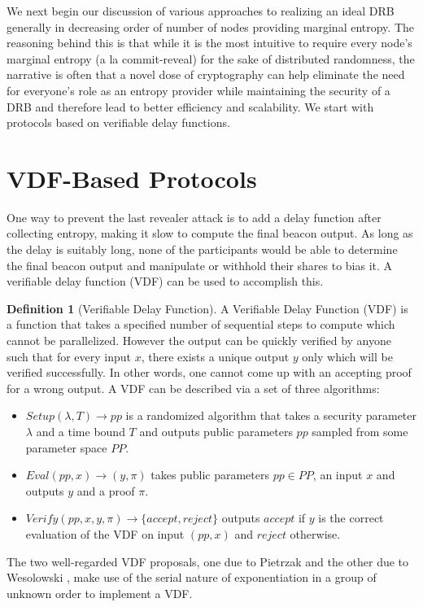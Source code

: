 \documentclass[letterpaper,twocolumn,10pt]{article}
\theoremstyle{definition}
\newtheorem{definition}[theorem]{Definition}
\theoremstyle{remark}
\begin{document}
We next begin our discussion of various approaches to realizing an ideal DRB generally in decreasing order of number of nodes providing marginal entropy. The reasoning behind this is that while it is the most intuitive to require every node's marginal entropy (a la commit-reveal) for the sake of distributed randomness, the narrative is often that a novel dose of cryptography can help eliminate the need for everyone's role as an entropy provider while maintaining the security of a DRB and therefore lead to better efficiency and scalability. We start with protocols based on verifiable delay functions.

\section{VDF-Based Protocols}
\label{section:vdf}
One way to prevent the last revealer attack is to add a delay function after collecting entropy, making it slow to compute the final beacon output. As long as the delay is suitably long, none of the participants would be able to determine the final beacon output and manipulate or withhold their shares to bias it. A verifiable delay function (VDF) \cite{boneh2018verifiable} can be used to accomplish this.
\begin{definition}[Verifiable Delay Function]
A Verifiable Delay Function (VDF) is a function that takes a specified number of sequential steps to compute which cannot be parallelized. However the output can be quickly verified by anyone such that for every input $x$, there exists a unique output $y$ only which will be verified successfully. In other words, one cannot come up with an accepting proof for a wrong output.
A VDF can be described via a set of three algorithms:
\begin{itemize}
\item $Setup(\lambda, T) \rightarrow pp$ is a randomized algorithm that takes a security parameter $\lambda$ and a time bound $T$  and outputs public parameters $pp$ sampled from some parameter space $PP$.
\item $Eval(pp, x) \rightarrow (y, \pi)$ takes public parameters $pp\in PP$, an input $x$ and outputs $y$ and a proof $\pi$.
\item $Verify(pp, x, y, \pi) \rightarrow \{accept, reject\}$ outputs $accept$ if $y$ is the correct evaluation of the VDF on input $(pp, x)$ and $reject$ otherwise.
\end{itemize}
\end{definition}
 The two well-regarded VDF proposals, one due to Pietrzak \cite{pietrzak2018simple} and the other due to Wesolowski \cite{wesolowski2019efficient}, make use of the serial nature of exponentiation in a group of unknown order to implement a VDF. 
\end{document}
